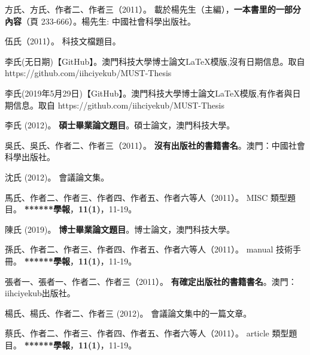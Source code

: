 
    \begin{thebibliography}{}


方氏、方氏、作者二、作者三（2011）。
\newblock  載於楊先生（主編），\textbf{一本書里的一部分內容}（頁 233-666）。楊先生: 中國社會科學出版社。

伍氏（2011）。
\newblock 科技文檔題目。

李氏(无日期)【GitHub】。澳門科技大學博士論文\LaTeX 模版,沒有日期信息。取自 https://github.com/iihciyekub/MUST-Thesis

李氏(2019年5月29日)【GitHub】。澳門科技大學博士論文\LaTeX 模版,有作者與日期信息。取自 https://github.com/iihciyekub/MUST-Thesis

李氏 (2012)。
\newblock \textbf{碩士畢業論文題目}。碩士論文，澳門科技大學。

吳氏、吳氏、作者二、作者三（2011）。
\newblock \textbf{ 沒有出版社的書籍書名}。澳門：中國社會科學出版社。

沈氏 (2012)。
\newblock 會議論文集。

馬氏、作者二、作者三、作者四、作者五、作者六等人（2011）。
\newblock MISC 類型題目。
\newblock \textbf{******學報}，\textbf{11}\textbf{(1)}，11-19。

陳氏 (2019)。
\newblock \textbf{博士畢業論文題目}。博士論文，澳門科技大學。

孫氏、作者二、作者三、作者四、作者五、作者六等人（2011）。
\newblock manual 技術手冊。
\newblock \textbf{******學報}，\textbf{11}\textbf{(1)}，11-19。

張者一、張者一、作者二、作者三（2011）。
\newblock \textbf{ 有確定出版社的書籍書名}。澳門：iihciyekub出版社。

楊氏、楊氏、作者二、作者三 (2012)。
\newblock 會議論文集中的一篇文章。

蔡氏、作者二、作者三、作者四、作者五、作者六等人（2011）。
\newblock article 類型題目。
\newblock \textbf{******學報}，\textbf{11}\textbf{(1)}，11-19。


\end{thebibliography}
